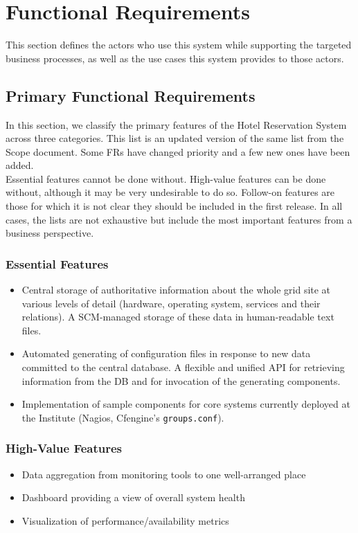 \documentclass[12pt]{article}
\begin{document}
\section{Functional Requirements}
This section defines the actors who use this system while supporting the targeted business processes, as well as the use cases this 
system provides to those actors.

\subsection{Primary Functional Requirements}
In this section, we classify the primary features of the Hotel Reservation System across three categories. This list is an updated 
version of the same list from the Scope document. Some FRs have changed priority and a few new ones have been added.\\
Essential features cannot be done without. High-value features can be done without, although it may be very undesirable to 
do so. Follow-on features are those for which it is not clear they should be included in the first release. In all cases, 
the lists are not exhaustive but include the most important features from a business perspective.

\subsubsection{Essential Features}
\begin{itemize}
	\item Central storage of authoritative information about the whole grid site
        at various levels of detail (hardware, operating system, services and
        their relations).  A SCM-managed storage of these data in human-readable
        text files.
	\item Automated generating of configuration files in response to new data
        committed to the central database.  A flexible and unified API for
        retrieving information from the DB and for invocation of the generating
        components.
  \item Implementation of sample components for core systems currently
        deployed at the Institute (Nagios, Cfengine's {\tt groups.conf}).
\end{itemize}

\subsubsection{High-Value Features}
\begin{itemize}
	  \item Data aggregation from monitoring tools to one well-arranged place
    \item Dashboard providing a view of overall system health
    \item Visualization of performance/availability metrics
\end{itemize}
\end{document}
